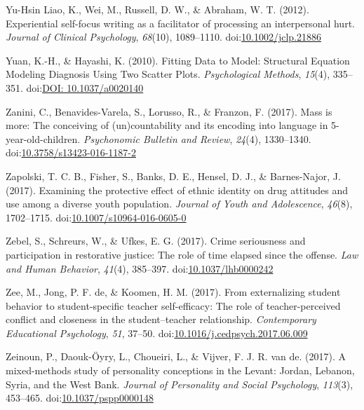\documentclass[english,man]{apa6}
\theoremstyle{definition}
\theoremstyle{definition}
\theoremstyle{definition}
\theoremstyle{remark}
\begin{document}
\hypertarget{ref-Yu-HsinLiao2012}{}
Yu-Hsin Liao, K., Wei, M., Russell, D. W., \& Abraham, W. T. (2012).
Experiential self-focus writing as a facilitator of processing an
interpersonal hurt. \emph{Journal of Clinical Psychology},
\emph{68}(10), 1089--1110.
doi:\href{https://doi.org/10.1002/jclp.21886}{10.1002/jclp.21886}

\hypertarget{ref-Yuan2010}{}
Yuan, K.-H., \& Hayashi, K. (2010). Fitting Data to Model: Structural
Equation Modeling Diagnosis Using Two Scatter Plots. \emph{Psychological
Methods}, \emph{15}(4), 335--351.
doi:\href{https://doi.org/DOI:\%2010.1037/a0020140}{DOI: 10.1037/a0020140}

\hypertarget{ref-Zanini2016}{}
Zanini, C., Benavides-Varela, S., Lorusso, R., \& Franzon, F. (2017).
Mass is more: The conceiving of (un)countability and its encoding into
language in 5-year-old-children. \emph{Psychonomic Bulletin and Review},
\emph{24}(4), 1330--1340.
doi:\href{https://doi.org/10.3758/s13423-016-1187-2}{10.3758/s13423-016-1187-2}

\hypertarget{ref-Zapolski2017}{}
Zapolski, T. C. B., Fisher, S., Banks, D. E., Hensel, D. J., \&
Barnes-Najor, J. (2017). Examining the protective effect of ethnic
identity on drug attitudes and use among a diverse youth population.
\emph{Journal of Youth and Adolescence}, \emph{46}(8), 1702--1715.
doi:\href{https://doi.org/10.1007/s10964-016-0605-0}{10.1007/s10964-016-0605-0}

\hypertarget{ref-Zebel2017}{}
Zebel, S., Schreurs, W., \& Ufkes, E. G. (2017). Crime seriousness and
participation in restorative justice: The role of time elapsed since the
offense. \emph{Law and Human Behavior}, \emph{41}(4), 385--397.
doi:\href{https://doi.org/10.1037/lhb0000242}{10.1037/lhb0000242}

\hypertarget{ref-Zee2017}{}
Zee, M., Jong, P. F. de, \& Koomen, H. M. (2017). From externalizing
student behavior to student-specific teacher self-efficacy: The role of
teacher-perceived conflict and closeness in the student--teacher
relationship. \emph{Contemporary Educational Psychology}, \emph{51},
37--50.
doi:\href{https://doi.org/10.1016/j.cedpsych.2017.06.009}{10.1016/j.cedpsych.2017.06.009}

\hypertarget{ref-Zeinoun2017}{}
Zeinoun, P., Daouk-Öyry, L., Choueiri, L., \& Vijver, F. J. R. van de.
(2017). A mixed-methods study of personality conceptions in the Levant:
Jordan, Lebanon, Syria, and the West Bank. \emph{Journal of Personality
and Social Psychology}, \emph{113}(3), 453--465.
doi:\href{https://doi.org/10.1037/pspp0000148}{10.1037/pspp0000148}
\end{document}
